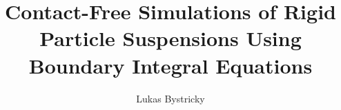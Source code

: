 \documentclass[11pt,expanded,copyright]{fsuthesis}
\title{Contact-Free Simulations of Rigid Particle Suspensions Using Boundary Integral Equations}
\author{Lukas Bystricky}
\begin{document}
\frontmatter
\maketitle
\makecommitteepage



\tableofcontents
\listoftables
\listoffigures



\end{document}
